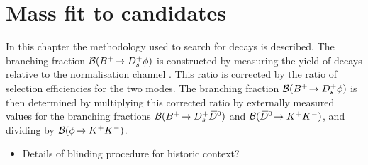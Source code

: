 \chapter{Mass fit to \decay{\Bp}{\Dsp\phiz} candidates} 
\label{ch:B2DsPhi}

\minitoc

In this chapter the methodology used to search for \decay{\Bp}{\Dsp\phiz} decays is described.
The branching fraction ${\mathcal{B}}({{{B}^+}}\!\rightarrow {\ensuremath{{D}^+_{s}}}\phi)$ is constructed by measuring the yield of \decay{\Bp}{\Dsp\phiz} decays relative to the normalisation channel \decay{\Bp}{\Dsp\Dzb}. This ratio is corrected by the ratio of selection efficiencies for the two modes. 
The branching fraction ${\mathcal{B}}({{{B}^+}}\!\rightarrow {\ensuremath{{D}^+_{s}}}\phi)$ is then determined by multiplying this corrected ratio by externally measured values for the branching fractions ${\mathcal{B}}({{{B}^+}}\!\rightarrow {\ensuremath{{D}^+_{s}}}{\ensuremath{{\kern 0.2em\overline{\kern -0.2em D}{}}{}^0}})$ and ${\mathcal{B}}({{\kern 0.2em\overline{\kern -0.2em D}{}}{}^0}\!\rightarrow {\ensuremath{{K}^+}}{\ensuremath{{K}^-}})$, and dividing by ${\mathcal{B}}(\phi\!\rightarrow {\ensuremath{{K}^+}}{\ensuremath{{K}^-}})$. 


{\color{Red}
\begin{itemize}
\item Details of blinding procedure for historic context?
\end{itemize}
}


